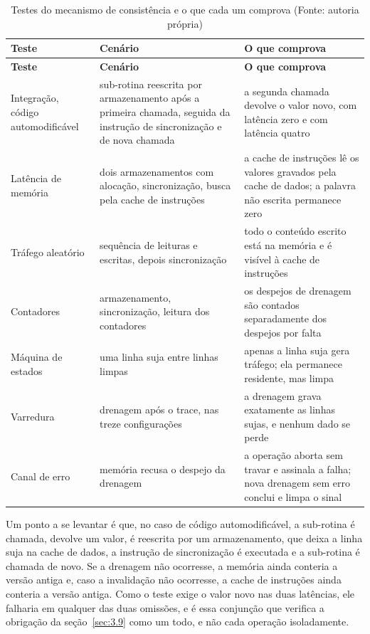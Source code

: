 {\small
\begin{longtable}{@{}>{\raggedright\arraybackslash}p{}>{\raggedright\arraybackslash}p{}>{\raggedright\arraybackslash}p{}@{}}
\caption[Testes do mecanismo de consistência e o que cada um comprova]{Testes do mecanismo de consistência e o que cada um comprova (Fonte: autoria própria)}\label{tab:4.3}\\
\hline
\textbf{Teste} & \textbf{Cenário} & \textbf{O que comprova} \\
\hline
\endfirsthead
\hline
\textbf{Teste} & \textbf{Cenário} & \textbf{O que comprova} \\
\hline
\endhead
\hline
\endlastfoot
Integração, código automodificável & sub-rotina reescrita por armazenamento após a primeira chamada, seguida da instrução de sincronização e de nova chamada & a segunda chamada devolve o valor novo, com latência zero e com latência quatro \\
Latência de memória & dois armazenamentos com alocação, sincronização, busca pela cache de instruções & a cache de instruções lê os valores gravados pela cache de dados; a palavra não escrita permanece zero \\
Tráfego aleatório & sequência de leituras e escritas, depois sincronização & todo o conteúdo escrito está na memória e é visível à cache de instruções \\
Contadores & armazenamento, sincronização, leitura dos contadores & os despejos de drenagem são contados separadamente dos despejos por falta \\
Máquina de estados & uma linha suja entre linhas limpas & apenas a linha suja gera tráfego; ela permanece residente, mas limpa \\
Varredura & drenagem após o trace, nas treze configurações & a drenagem grava exatamente as linhas sujas, e nenhum dado se perde \\
Canal de erro & memória recusa o despejo da drenagem & a operação aborta sem travar e assinala a falha; nova drenagem sem erro conclui e limpa o sinal \\
\end{longtable}
}

Um ponto a se levantar é que, no caso de código automodificável, a sub-rotina é chamada, devolve um valor, é reescrita por um armazenamento, que deixa a linha suja na cache de dados, a instrução de sincronização é executada e a sub-rotina é chamada de novo. Se a drenagem não ocorresse, a memória ainda conteria a versão antiga e, caso a invalidação não ocorresse, a cache de instruções ainda conteria a versão antiga. Como o teste exige o valor novo nas duas latências, ele falharia em qualquer das duas omissões, e é essa conjunção que verifica a obrigação da seção~\ref{sec:3.9} como um todo, e não cada operação isoladamente.

